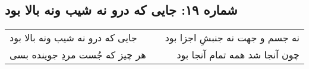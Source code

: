 \begin{center}
\section*{شماره ۱۹: جایی که درو نه شیب ونه بالا بود}
\label{sec:019}
\begin{longtable}{l p{0.5cm} r}
جایی که درو نه شیب ونه بالا بود
&&
نه جسم و جهت نه جنبشِ اجزا بود
\\
هر چیز که جُست مردِ جوینده بسی
&&
چون آنجا شد همه تمام آنجا بود
\\
\end{longtable}
\end{center}
